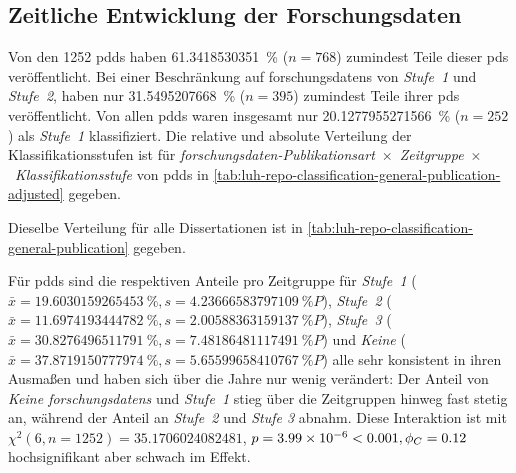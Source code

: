 \subsection{Zeitliche Entwicklung der Forschungsdaten}\label{sec:luh-repo-results-time}
Von den \num{1252} \glspl{pdd} haben \SI[round-mode=places,round-precision=2]{61.3418530351}{\percent} ($n=\num{768}$) zumindest Teile dieser \glspl{pd} veröffentlicht.
Bei einer Beschränkung auf \glspl{forschungsdaten} von \textit{Stufe~1} und \textit{Stufe~2}, haben nur \SI[round-mode=places,round-precision=2]{31.5495207668}{\percent} ($n=\num{395}$) zumindest Teile ihrer \glspl{pd} veröffentlicht.
Von allen \glspl{pdd} waren insgesamt nur \SI[round-mode=places,round-precision=2]{20.1277955271566}{\percent} ($n=252$) als \textit{Stufe~1} klassifiziert.
Die relative und absolute Verteilung der Klassifikationsstufen ist für \textit{\gls{forschungsdaten}-Publikationsart}~$\times$~\textit{Zeitgruppe}~$\times$~\textit{Klassifikationsstufe} von \glspl{pdd} in \cref{tab:luh-repo-classification-general-publication-adjusted} gegeben.
\begin{table}[!htbp]
	\caption{\gls{forschungsdaten}-Klassifizierung der \glspl{pdd} aus der Stichprobe nach \textit{Publikationsart}~$\times$~\textit{Klassifikationsstufe}~$\times$~\textit{Jahresgruppe} aufgegliedert.
    Angaben relativ zu der Gesamtanzahl der jeweiligen Zeitgruppe.
    Absolute Werte in Klammern angegeben.}
    
    \label{tab:luh-repo-classification-general-publication-adjusted}
\end{table}
Dieselbe Verteilung für alle Dissertationen ist in \cref{tab:luh-repo-classification-general-publication} gegeben.

Für \glspl{pdd} sind die respektiven Anteile pro Zeitgruppe für \textit{Stufe~1} ($\bar{x}=\SI[round-mode=places,round-precision=2]{19.6030159265453}{\percent},s=\SI[round-mode=places,round-precision=2]{4.23666583797109}{\percent P}$), \textit{Stufe~2} ($\bar{x}=\SI[round-mode=places,round-precision=2]{11.6974193444782}{\percent},s=\SI[round-mode=places,round-precision=2]{2.00588363159137}{\percent P}$), \textit{Stufe~3} ($\bar{x}=\SI[round-mode=places,round-precision=2]{30.8276496511791}{\percent},s=\SI[round-mode=places,round-precision=2]{7.48186481117491}{\percent P}$) und \textit{Keine} ($\bar{x}=\SI[round-mode=places,round-precision=2]{37.8719150777974}{\percent},s=\SI[round-mode=places,round-precision=2]{5.65599658410767}{\percent P}$) alle sehr konsistent in ihren Ausmaßen und haben sich über die Jahre nur wenig verändert:
Der Anteil von \textit{Keine \glspl{forschungsdaten}} und \textit{Stufe~1} stieg über die Zeitgruppen hinweg fast stetig an, während der Anteil an \textit{Stufe~2} und \textit{Stufe 3} abnahm.
Diese Interaktion ist mit $\chi^2 (\num{6}, n=\num{1252}) = \num[round-mode=places,round-precision=2]{35.1706024082481}$, $p = \num[round-mode=places,round-precision=2]{3.99360804013405E-06}<\num{0.001},\phi_C=\num[round-mode=places,round-precision=2]{0.118514841833938}$ hochsignifikant aber schwach im Effekt.
\pagebreak

